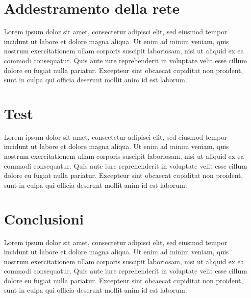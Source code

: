 \documentclass[a4paper,11pt]{article}
\begin{document}
    \section{Addestramento della rete}
    Lorem ipsum dolor sit amet, consectetur adipisci elit, 
    sed eiusmod tempor incidunt ut labore et dolore magna aliqua.
    Ut enim ad minim veniam, quis nostrum exercitationem ullam corporis suscipit laboriosam,
    nisi ut aliquid ex ea commodi consequatur. Quis aute iure reprehenderit in voluptate
    velit esse cillum dolore eu fugiat nulla pariatur. Excepteur sint obcaecat cupiditat
    non proident, sunt in culpa qui officia deserunt mollit anim id est laborum.
    \section{Test}
    Lorem ipsum dolor sit amet, consectetur adipisci elit, 
    sed eiusmod tempor incidunt ut labore et dolore magna aliqua.
    Ut enim ad minim veniam, quis nostrum exercitationem ullam corporis suscipit laboriosam,
    nisi ut aliquid ex ea commodi consequatur. Quis aute iure reprehenderit in voluptate
    velit esse cillum dolore eu fugiat nulla pariatur. Excepteur sint obcaecat cupiditat
    non proident, sunt in culpa qui officia deserunt mollit anim id est laborum.

    \newpage
    \section{Conclusioni} 
    Lorem ipsum dolor sit amet, consectetur adipisci elit, 
    sed eiusmod tempor incidunt ut labore et dolore magna aliqua.
    Ut enim ad minim veniam, quis nostrum exercitationem ullam corporis suscipit laboriosam,
    nisi ut aliquid ex ea commodi consequatur. Quis aute iure reprehenderit in voluptate
    velit esse cillum dolore eu fugiat nulla pariatur. Excepteur sint obcaecat cupiditat
    non proident, sunt in culpa qui officia deserunt mollit anim id est laborum.


    
\end{document}
